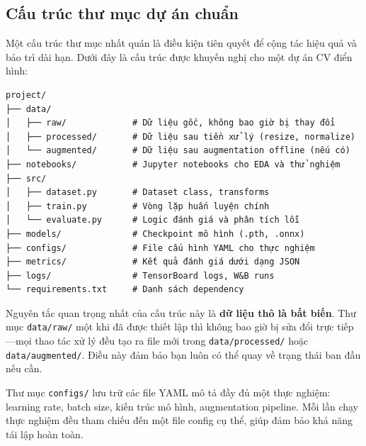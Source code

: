\subsection{Cấu trúc thư mục dự án chuẩn}
\label{subsec:project_structure}

Một cấu trúc thư mục nhất quán là điều kiện tiên quyết để cộng tác hiệu quả và bảo trì dài hạn. Dưới đây là cấu trúc được khuyến nghị cho một dự án CV điển hình:

\begin{verbatim}
project/
├── data/
│   ├── raw/             # Dữ liệu gốc, không bao giờ bị thay đổi
│   ├── processed/       # Dữ liệu sau tiền xử lý (resize, normalize)
│   └── augmented/       # Dữ liệu sau augmentation offline (nếu có)
├── notebooks/           # Jupyter notebooks cho EDA và thử nghiệm
├── src/
│   ├── dataset.py       # Dataset class, transforms
│   ├── train.py         # Vòng lặp huấn luyện chính
│   └── evaluate.py      # Logic đánh giá và phân tích lỗi
├── models/              # Checkpoint mô hình (.pth, .onnx)
├── configs/             # File cấu hình YAML cho thực nghiệm
├── metrics/             # Kết quả đánh giá dưới dạng JSON
├── logs/                # TensorBoard logs, W&B runs
└── requirements.txt     # Danh sách dependency
\end{verbatim}

Nguyên tắc quan trọng nhất của cấu trúc này là \textbf{dữ liệu thô là bất biến}. Thư mục \texttt{data/raw/} một khi đã được thiết lập thì không bao giờ bị sửa đổi trực tiếp---mọi thao tác xử lý đều tạo ra file mới trong \texttt{data/processed/} hoặc \texttt{data/augmented/}. Điều này đảm bảo bạn luôn có thể quay về trạng thái ban đầu nếu cần.

Thư mục \texttt{configs/} lưu trữ các file YAML mô tả đầy đủ một thực nghiệm: learning rate, batch size, kiến trúc mô hình, augmentation pipeline. Mỗi lần chạy thực nghiệm đều tham chiếu đến một file config cụ thể, giúp đảm bảo khả năng tái lập hoàn toàn.
